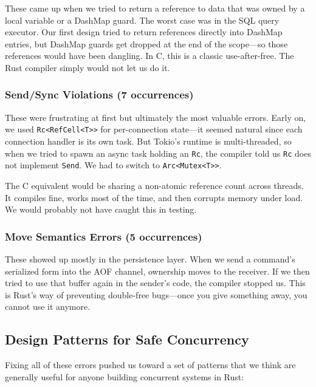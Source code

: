 \documentclass[conference,a4paper]{IEEEtran}
\begin{document}
These came up when we tried to return a reference to data that was owned by a local variable or a DashMap guard. The worst case was in the SQL query executor. Our first design tried to return references directly into DashMap entries, but DashMap guards get dropped at the end of the scope---so those references would have been dangling. In C, this is a classic use-after-free. The Rust compiler simply would not let us do it.

\subsubsection{Send/Sync Violations (7 occurrences)}

These were frustrating at first but ultimately the most valuable errors. Early on, we used \texttt{Rc\textless RefCell\textless T\textgreater\textgreater} for per-connection state---it seemed natural since each connection handler is its own task. But Tokio's runtime is multi-threaded, so when we tried to spawn an async task holding an \texttt{Rc}, the compiler told us \texttt{Rc} does not implement \texttt{Send}. We had to switch to \texttt{Arc\textless Mutex\textless T\textgreater\textgreater}.

The C equivalent would be sharing a non-atomic reference count across threads. It compiles fine, works most of the time, and then corrupts memory under load. We would probably not have caught this in testing.

\subsubsection{Move Semantics Errors (5 occurrences)}

These showed up mostly in the persistence layer. When we send a command's serialized form into the AOF channel, ownership moves to the receiver. If we then tried to use that buffer again in the sender's code, the compiler stopped us. This is Rust's way of preventing double-free bugs---once you give something away, you cannot use it anymore.

\subsection{Design Patterns for Safe Concurrency}

Fixing all of these errors pushed us toward a set of patterns that we think are generally useful for anyone building concurrent systems in Rust:
\end{document}
